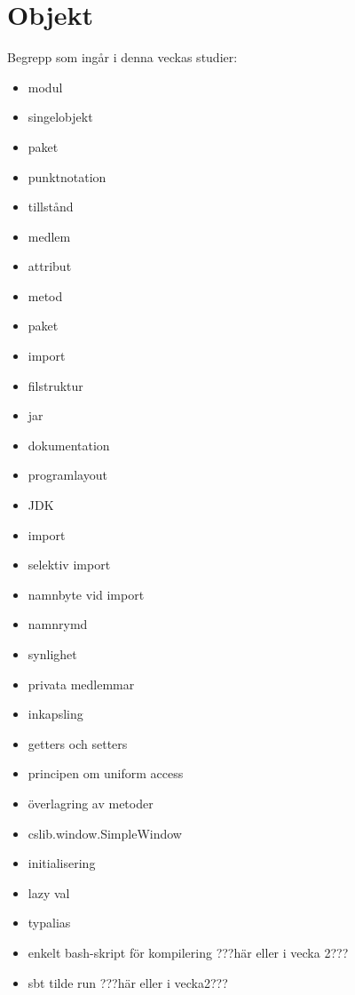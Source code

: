 \chapter{Objekt}\label{chapter:W04}
Begrepp som ingår i denna veckas studier:
\begin{multicols}{2}\begin{itemize}[noitemsep,label={$\square$},leftmargin=*]
\item modul
\item singelobjekt
\item paket
\item punktnotation
\item tillstånd
\item medlem
\item attribut
\item metod
\item paket
\item import
\item filstruktur
\item jar
\item dokumentation
\item programlayout
\item JDK
\item import
\item selektiv import
\item namnbyte vid import
\item namnrymd
\item synlighet
\item privata medlemmar
\item inkapsling
\item getters och setters
\item principen om uniform access
\item överlagring av metoder
\item cslib.window.SimpleWindow
\item initialisering
\item lazy val
\item typalias
\item enkelt bash-skript för kompilering ???här eller i vecka 2???
\item sbt tilde run ???här eller i vecka2???\end{itemize}\end{multicols}
